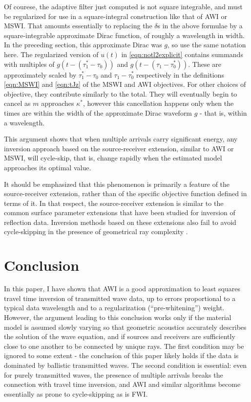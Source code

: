 Of courese, the adaptive filter just computed is not square
integrable, and must be regularized for use in a square-integral
construction like that of AWI or MSWI. That amounts essentially to
replacing the $\delta$s in the above formulae by a square-integrable
approximate Dirac function, of roughly a wavelength in width. In the
preceding section, this approximate Dirac was $g$, so use the same
notation here. The regularized version of $u(t)$ in
\ref{eqn:notl2explicit} contains summands with multiples of $g(t-(\tau^*_1-\tau_0))$
and $g(t-(\tau_1-\tau^*_0))$. These are approximately scaled by
$\tau^*_1-\tau_0$ and $\tau_1-\tau^*_0$ respectively in the
definitions \ref{eqn:MSWI} and \ref{eqn:tJz} of the MSWI and AWI
objectives. For other choices of objective, they contribute similarly
to the total. They will eventually begin to cancel as $m$ approaches
$\kappa^*$, however this cancellation happens only when the times are
within the width of the approximate 
Dirac waveform $g$ - that is, within a wavelength.

This argument shows that when multiple arrivals carry significant energy, any
inversion approach based on the source-receiver extension, similar to
AWI or MSWI, will cycle-skip, that is, change rapidly when the
estimated model approaches its optimal value.

It should be emphasized that this phenomenon is primarily a feature of the
source-receiver extension, rather than of the specific objective
function defined in terms of it. In that respect, the source-receiver
extension is similar to the common surface parameter extensions that
have been studied for inversion of reflection data. Inversion methods
based on these extensions also fail to avoid cycle-skipping in the presence of
geometrical ray complexity \cite[]{geoprosp:2008}.

\section{Conclusion}
In this paper, I have shown that AWI is a good approximation to least
squares travel time inversion of transmitted wave data, up to errors proportional to a typical
data wavelength and to a regularization (``pre-whitening'')
weight. However, the argument leading to this conclusion works only if
the material model is assumed slowly varying so that geometric
acoustics accurately describes the solution of the wave equation, and if
sources and receivers are sufficiently close to one another to be
connected by unique rays. The first condition may be ignored to some
extent - the conclusion of this paper likely holds if the data is
dominated by ballistic transmitted waves. The second condition
is essential: even for purely transmitted waves, the presence of
multiple arrivals breaks the connection
with travel time inversion, and AWI and similar algorithms
become essentially as prone to cycle-skipping as is FWI.


